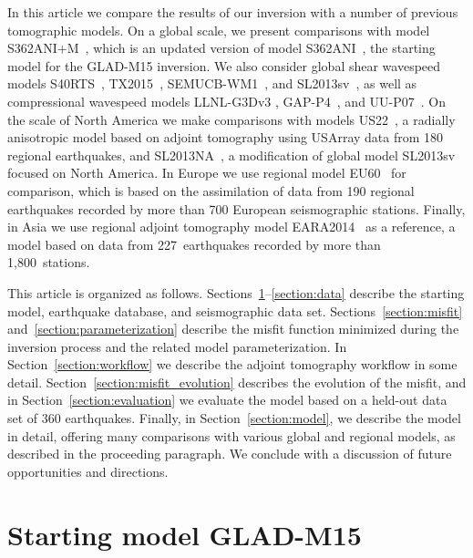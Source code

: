 In this article we compare the results of our inversion with a number of previous tomographic models.
On a global scale, we present comparisons with model S362ANI$+$M~\cite{moulik2014anisotropic},
which is an updated version of model S362ANI~\cite{kustowski2008anisotropic},
the starting model for the GLAD-M15 inversion.
We also consider global shear wavespeed models S40RTS~\cite{ritsema2011s40rts},
TX2015~\cite{TX2015}, SEMUCB-WM1~\cite{french2015broad},
and SL2013sv~\cite{SchaefferLebedev13},
as well as compressional wavespeed models LLNL-G3Dv3 \cite{simmons2012llnl}, GAP-P4~\cite{fukao2013subducted}, and UU-P07~\cite{van2018atlas}.
On the scale of North America
we make comparisons with models US22~\cite{zhu2017radial},
a radially anisotropic model based on adjoint tomography using USArray data from 180 regional earthquakes,
and SL2013NA~\cite{schaeffer2014imaging},
a modification of global model SL2013sv focused on North America.
In Europe we use regional model EU60~\cite{zhu2015seismic} for comparison,
which is based on the assimilation of data from 190 regional earthquakes recorded by more than 700 European seismographic stations.
Finally, in Asia we use regional adjoint tomography model EARA2014~\cite{chen2015multiparameter} as a reference, a model based on data from 227~earthquakes recorded by more than 1,800~stations.

This article is organized as follows.
Sections~\ref{section:start}--\ref{section:data} describe the starting model,
earthquake database, and seismographic data set. 
Sections~\ref{section:misfit} and~\ref{section:parameterization} describe the misfit function minimized during the inversion process
and the related model parameterization.
In Section~\ref{section:workflow} we describe the adjoint tomography workflow in some detail.
Section~\ref{section:misfit_evolution} describes the evolution of the misfit, and in Section~\ref{section:evaluation} we evaluate the model based on a held-out data set of 360 earthquakes.
Finally, in Section~\ref{section:model}, we describe the model in detail,
offering many comparisons with various global and regional models, as described in the proceeding paragraph.
We conclude with a discussion of future opportunities and directions.

\section{Starting model GLAD-M15}
\label{section:start}

